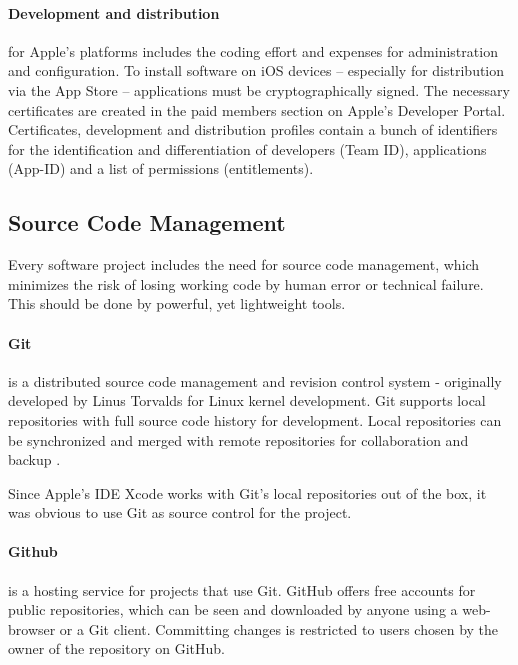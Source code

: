 \paragraph{Development and distribution}
\label{sec:DAD}
for Apple's platforms includes the coding effort and expenses for administration and configuration. 
To install software on iOS devices – especially for distribution via the App Store – applications must be cryptographically signed. 
The necessary certificates are created in the paid members section on Apple's Developer Portal. 
Certificates, development and distribution profiles contain a bunch of identifiers for the identification and differentiation of developers (Team ID), 
applications (App-ID) and a list of permissions (entitlements). 

\subsection{Source Code Management}
\label{sec:SCM}

Every software project includes the need for source code management,
which minimizes the risk of losing working code
by human error or technical failure.
This should be done by powerful, yet lightweight tools.



\paragraph{Git \cite{Git:Main}}
\label{sec:GIT}
is a distributed source code management and revision control system 
- originally developed by Linus Torvalds for Linux kernel development.
Git supports local repositories with full source code history for development.
Local repositories can be synchronized and merged with remote repositories for collaboration and backup
\cite{Chacon:2009:PG:1618548}.

Since Apple's IDE Xcode works with Git's local repositories out of the box,
it was obvious to use Git as source control for the project.

\paragraph{Github \cite{GitHub:Main}}
\label{sec.GITHUB}
is a hosting service for projects that use Git. 
GitHub offers free accounts for public repositories, 
which can be seen and downloaded by anyone
using a web-browser or a Git client.
Committing changes is restricted to users chosen by the owner of the repository on GitHub.


